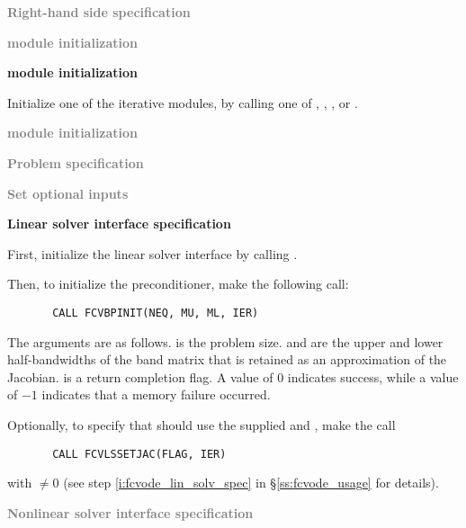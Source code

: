\begin{Steps}
  
\item \textcolor{gray}{\bf Right-hand side specification}

\item \textcolor{gray}{\bf {\nvector} module initialization}

\item {\bf {\sunlinsol} module initialization}

  Initialize one of the iterative {\sunlinsol} modules, by calling one
  of , , ,
   or .

\item \textcolor{gray}{\bf {\sunnonlinsol} module initialization}

\item \textcolor{gray}{\bf Problem specification}

\item \textcolor{gray}{\bf Set optional inputs}

\item {\bf Linear solver interface specification}

  First, initialize the {\cvls} linear solver interface
  by calling .

  Then, to initialize the {\cvbandpre} preconditioner, make the following call:
\begin{verbatim}
       CALL FCVBPINIT(NEQ, MU, ML, IER)
\end{verbatim}
  The arguments are as follows.
   is the problem size.
   and  are the upper and lower half-bandwidths of the band matrix
  that  is retained as an approximation of the Jacobian.
   is a return completion flag.  A value of $0$ indicates success, while 
  a value of $-1$ indicates that a memory failure occurred.
    
  Optionally, to specify that {\cvls} should use the supplied
   and , make the call 
\begin{verbatim}
       CALL FCVLSSETJAC(FLAG, IER)
\end{verbatim}
  with  $\neq 0$ 
  (see step \ref{i:fcvode_lin_solv_spec} in \S\ref{ss:fcvode_usage} for details).
  
\item \textcolor{gray}{\bf Nonlinear solver interface specification}
  

\end{Steps}

